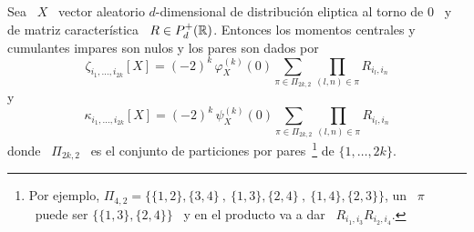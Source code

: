 \begin{teorema}
  Sea \  $X$ \  vector aleatorio $d$-dimensional  de distribuci\'on  eliptica al
  torno de $0$  \ y de matriz caracter\'istica \  $R \in P_d^+(\mathbb{R})$. Entonces
  los momentos  centrales y cumulantes impares  son nulos y los  pares son dados
  por
  \[
  \zeta_{i_1,\ldots,i_{2  k}}[X] =  (-2)^k \,  \varphi_X^{(k)}(0)  \sum_{\pi \in
    \Pi_{2 k , 2}} \prod_{(l,n) \in \pi} R_{i_l,i_n}
  \]
  y
  \[
  \kappa_{i_1,\ldots,i_{2  k}}[X]  =  (-2)^k  \, \psi_X^{(k)}(0)  \sum_{\pi  \in
    \Pi_{2 k , 2}} \prod_{(l,n) \in \pi} R_{i_l,i_n}
  \]
  donde   \  $\Pi_{2   k  ,   2}$   \  es   el  conjunto   de  particiones   por
  pares~\footnote{Por ejemplo,  $\Pi_{4,2} =  \big\{ \{1,2\} ,  \{3,4\} \:  , \:
    \{1,3\} , \{2,4\} \: , \: \{1,4\}  , \{2,3\} \big\}$, un \ $\pi$ \ puede ser
    $\big\{ \{1,3\} , \{2,4\} \big\}$ \ y en el producto va a dar \ $R_{i_1,i_3}
    R_{i_2,i_4}$.} de $\{ 1 , \ldots , 2 k \}$.
\end{teorema}
%
